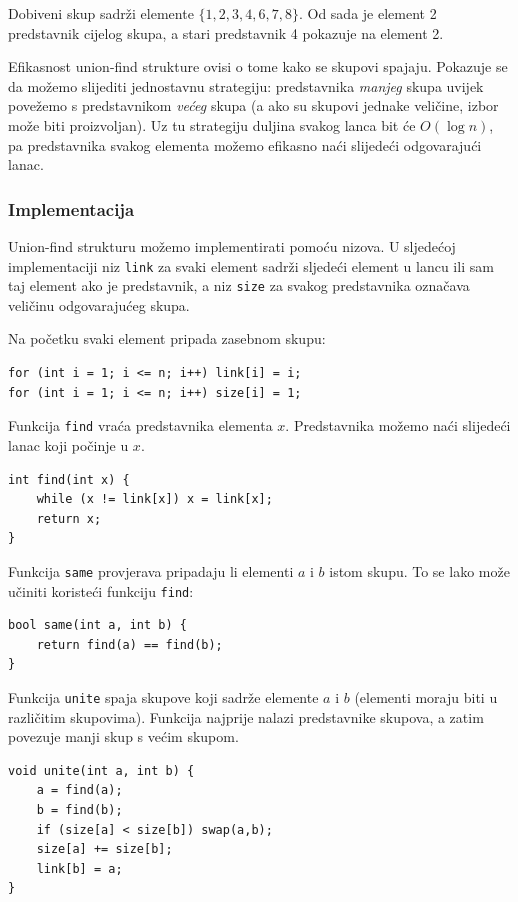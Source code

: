 Dobiveni skup sadrži elemente
$\{1,2,3,4,6,7,8\}$.
Od sada je element 2 predstavnik
cijelog skupa, a stari predstavnik 4
pokazuje na element 2.

Efikasnost union-find strukture ovisi o tome
kako se skupovi spajaju.
Pokazuje se da možemo slijediti jednostavnu strategiju:
predstavnika \emph{manjeg} skupa uvijek
povežemo s predstavnikom \emph{većeg} skupa
(a ako su skupovi jednake veličine,
izbor može biti proizvoljan).
Uz tu strategiju duljina svakog lanca
bit će $O(\log n)$, pa predstavnika
svakog elementa možemo
efikasno naći slijedeći odgovarajući lanac.

\subsubsection{Implementacija}

Union-find strukturu možemo implementirati
pomoću nizova.
U sljedećoj implementaciji
niz \texttt{link} za svaki element sadrži
sljedeći element
u lancu ili sam taj element ako je
predstavnik,
a niz \texttt{size} za svakog predstavnika označava
veličinu odgovarajućeg skupa.

Na početku svaki element pripada zasebnom skupu:
\begin{lstlisting}
for (int i = 1; i <= n; i++) link[i] = i;
for (int i = 1; i <= n; i++) size[i] = 1;
\end{lstlisting}

Funkcija \texttt{find} vraća
predstavnika elementa $x$.
Predstavnika možemo naći slijedeći
lanac koji počinje u $x$.

\begin{lstlisting}
int find(int x) {
    while (x != link[x]) x = link[x];
    return x;
}
\end{lstlisting}

Funkcija \texttt{same} provjerava
pripadaju li elementi $a$ i $b$ istom skupu.
To se lako može učiniti koristeći
funkciju \texttt{find}:

\begin{lstlisting}
bool same(int a, int b) {
    return find(a) == find(b);
}
\end{lstlisting}

\begin{samepage}
Funkcija \texttt{unite} spaja skupove
koji sadrže elemente $a$ i $b$
(elementi moraju biti u različitim skupovima).
Funkcija najprije nalazi predstavnike
skupova, a zatim povezuje manji
skup s većim skupom.

\begin{lstlisting}
void unite(int a, int b) {
    a = find(a);
    b = find(b);
    if (size[a] < size[b]) swap(a,b);
    size[a] += size[b];
    link[b] = a;
}
\end{lstlisting}
\end{samepage}

